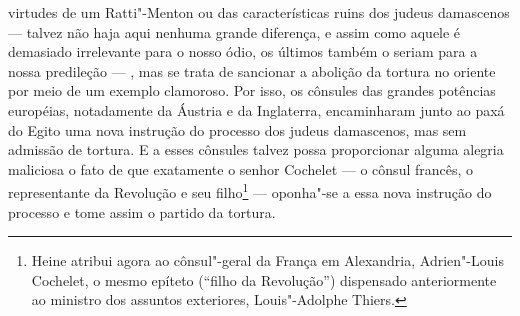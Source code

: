 virtudes de um Ratti"-Menton ou das características ruins dos judeus
damascenos --- talvez não haja aqui nenhuma grande diferença, e assim
como aquele é demasiado irrelevante para o nosso ódio, os últimos
também o seriam para a nossa predileção --- , mas se trata de sancionar a
abolição da tortura no oriente por meio de um exemplo clamoroso. Por
isso, os cônsules das grandes potências européias, notadamente da
Áustria e da Inglaterra, encaminharam junto ao paxá do Egito uma nova
instrução do processo dos judeus damascenos, mas sem admissão de
tortura. E a esses cônsules talvez possa proporcionar alguma alegria
maliciosa o fato de que exatamente o senhor Cochelet --- o cônsul
francês, o representante da Revolução e seu filho\footnote{ Heine
atribui agora ao cônsul"-geral da França em Alexandria, Adrien"-Louis
Cochelet, o mesmo epíteto (“filho da Revolução”) dispensado
anteriormente ao ministro dos assuntos exteriores, Louis"-Adolphe
Thiers.} --- oponha"-se a essa nova instrução do processo e tome
assim o partido da tortura.



